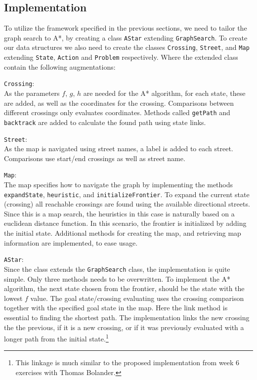 \subsection{Implementation}
To utilize the framework specified in the previous sections, we need to tailor the graph search to A*, by creating a class \texttt{AStar} extending \texttt{GraphSearch}. To create our data structures we also need to create the classes \texttt{Crossing}, \texttt{Street}, and \texttt{Map} extending \texttt{State}, \texttt{Action} and \texttt{Problem} respectively. Where the extended class contain the following augmentations:

\texttt{Crossing}: \\
As the parameters $f$, $g$, $h$ are needed for the A* algorithm, for each state, these are added, as well as the coordinates for the crossing. Comparisons between different crossings only evaluates coordinates. Methods called \texttt{getPath} and \texttt{backtrack} are added to calculate the found path using state links.

\texttt{Street}: \\
As the map is navigated using street names, a label is added to each street. Comparisons use start/end crossings as well as street name.

\texttt{Map}: \\
The map specifies how to navigate the graph by implementing the methods \texttt{expandState}, \texttt{heuristic}, and \texttt{initializeFrontier}. To expand the current state (crossing) all reachable crossings are found using the available directional streets. Since this is a map search, the heuristics in this case is naturally based on a euclidean distance function. In this scenario, the frontier is initialized by adding the initial state. Additional methods for creating the map, and retrieving map information are implemented, to ease usage.

\texttt{AStar}: \\
Since the class extends the \texttt{GraphSearch} class, the implementation is quite simple. Only three methods needs to be overwritten. To implement the A* algorithm, the next state chosen from the frontier, should be the state with the lowest $f$ value. The goal state/crossing evaluating uses the crossing comparison together with the specified goal state in the map. Here the link method is essential to finding the shortest path. The implementation links the new crossing the the previous, if it is a new crossing, or if it was previously evaluated with a longer path from the initial state.\footnote{This linkage is much similar to the proposed implementation from week 6 exercises with Thomas Bolander.}

